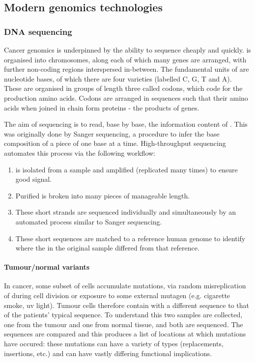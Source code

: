 \documentclass[thesis.tex]{subfiles}
\begin{document}
\subsection{Modern genomics technologies} \label{sec:sequencing}

\subsubsection{DNA sequencing}
Cancer genomics is underpinned by the ability to sequence  cheaply and quickly.  is organised into chromosomes, along each of which many genes are arranged, with further non-coding regions interspersed in-between. The fundamental units of  are nucleotide bases, of which there are four varieties (labelled C, G, T and A). These are organised in groups of length three called codons, which code for the production amino acids. Codons are arranged in sequences such that their amino acids when joined in chain form proteins - the products of genes. 

The aim of sequencing is to read, base by base, the information content of . This was originally done by Sanger sequencing, a procedure to infer the base composition of a piece of  one base at a time. High-throughput sequencing automates this process via the following workflow:

\begin{enumerate}
    \item {} is isolated from a sample and amplified (replicated many times) to ensure good signal.
    \item Purified  is broken into many pieces of manageable length.
    \item These short strands are sequenced individually and simultaneously by an automated process similar to Sanger sequencing.
    \item These short sequences are matched to a reference human genome to identify where the  in the original sample differed from that reference.
\end{enumerate}

\paragraph{Tumour/normal variants}
In cancer, some subset of cells accumulate mutations, via random misreplication of  during cell division or exposure to some external mutagen (e.g. cigarette smoke, \gls{uv} light). Tumour cells therefore contain  with a different sequence to that of the patients' typical sequence. To understand this two samples are collected, one from the tumour and one from normal tissue, and both are sequenced. The sequences are compared and this produces a list of locations at which mutations have occured: these mutations can have a variety of types (replacements, insertions, etc.) and can have vastly differing functional implications.
\end{document}
